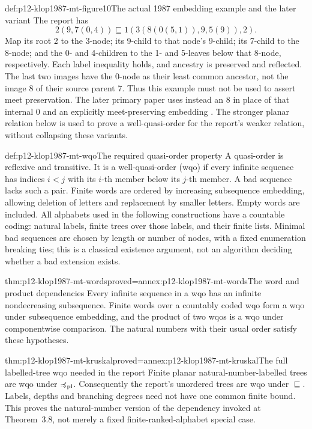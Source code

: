 \begin{hbexample}{def:p12-klop1987-mt-figure10}{The actual 1987 embedding example and the later variant}
The report has
\[
 2(9,7(0,4))\sqsubseteq1(3(8(0(5,1)),9,5(9)),2).
\]
Map its root 2 to the 3-node; its 9-child to that node's 9-child;
its 7-child to the 8-node; and the 0- and 4-children to the 1- and 5-leaves
below that 8-node, respectively. Each label inequality holds, and
ancestry is preserved and reflected. The last two images have the 0-node
as their least common ancestor, not the image 8 of their source parent 7.
Thus this example must not be used to assert meet preservation.
The later primary paper uses instead an 8 in place of that internal 0
and an explicitly meet-preserving embedding
\parencite[Example4.3]{EndrullisKlopOverbeek2021MarkedTrees}.
The stronger planar relation below is used to prove a well-quasi-order
for the report's weaker relation, without collapsing these variants.
\end{hbexample}

\begin{hbdefinition}{def:p12-klop1987-mt-wqo}{The required quasi-order property}
A quasi-order is reflexive and transitive. It is a well-quasi-order
(wqo) if every infinite sequence has indices \(i<j\) with its
\(i\)-th member below its \(j\)-th member. A bad sequence lacks
such a pair. Finite words are ordered by increasing subsequence
embedding, allowing deletion of letters and replacement by smaller
letters. Empty words are included.
All alphabets used in the following constructions have a countable
coding: natural labels, finite trees over those labels, and their
finite lists. Minimal bad sequences are chosen by length or number
of nodes, with a fixed enumeration breaking ties; this is a classical
existence argument, not an algorithm deciding whether a bad extension
exists.
\end{hbdefinition}

\begin{hblemma}{thm:p12-klop1987-mt-words}{proved=annex:p12-klop1987-mt-words}{The word and product dependencies}
Every infinite sequence in a wqo has an infinite nondecreasing
subsequence. Finite words over a countably coded wqo form a wqo under
subsequence embedding, and the product of two wqos is a wqo under
componentwise comparison. The natural numbers with their usual order
satisfy these hypotheses.
\end{hblemma}

\begin{hbtheorem}{thm:p12-klop1987-mt-kruskal}{proved=annex:p12-klop1987-mt-kruskal}{The full labelled-tree wqo needed in the report}
Finite planar natural-number-labelled trees are wqo under
\(\preccurlyeq_{\rm pl}\). Consequently the report's unordered
trees are wqo under \(\sqsubseteq\). Labels, depths and branching
degrees need not have one common finite bound. This proves the
natural-number version of the dependency invoked at Theorem~3.8,
not merely a fixed finite-ranked-alphabet special case.
\end{hbtheorem}

